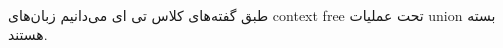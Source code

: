 \\
طبق گفته‌های کلاس تی ای می‌دانیم زبان‌های context free تحت عملیات union بسته هستند.



\pagebreak



\pagebreak
